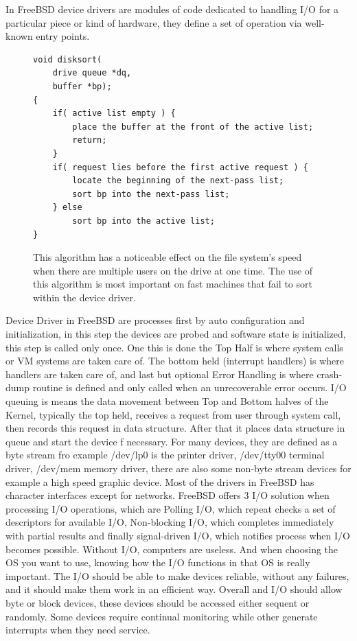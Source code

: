 \documentclass[letterpaper,10pt,draftclsnofoot,onecolumn]{IEEEtran}
\begin{document}
In FreeBSD device drivers are modules of code dedicated to handling I/O for a particular piece or kind of hardware, they define a set of operation via well-known entry points.
\begin{figure}[H]
\caption{This algorithm has a noticeable effect on the file system's speed when there are multiple users on the drive at one time. The use of this algorithm is most important on fast machines that fail to sort within the device driver.}
\begin{lstlisting}
void disksort(
	drive queue *dq,
	buffer *bp);
{
	if( active list empty ) {
		place the buffer at the front of the active list;
		return;
	}
	if( request lies before the first active request ) {
		locate the beginning of the next-pass list;
		sort bp into the next-pass list;
	} else
		sort bp into the active list;
}
\end{lstlisting}
\end{figure}
Device Driver in FreeBSD are processes first by auto configuration and initialization, in this step the devices are probed and software state is initialized, this step is called only once. One this is done the Top Half is where system calls or VM systems are taken care of. The bottom held (interrupt handlers) is where handlers are taken care of, and last but optional Error Handling is where crash-dump routine is defined and only called when an unrecoverable error occurs. I/O queuing is means the data movement between Top and Bottom halves of the Kernel, typically the top held, receives a request from user through system call, then records this request in data structure. After that it places data structure in queue and start the device f necessary. For many devices, they are defined as a byte stream fro example /dev/lp0 is the printer driver, /dev/tty00 terminal driver, /dev/mem memory driver, there are also some non-byte stream devices for example a high speed graphic device. Most of the drivers in FreeBSD has character interfaces except for networks.
FreeBSD offers 3 I/O solution when processing I/O operations, which are Polling I/O, which repeat checks a set of descriptors for available I/O, Non-blocking I/O, which completes immediately with partial results and finally signal-driven I/O, which notifies process when I/O becomes possible.\cite{[2]}
Without I/O, computers are useless. And when choosing the OS you want to use, knowing how the I/O functions in that OS is really important. The I/O should be able to make devices reliable, without any failures, and it should make them work in an efficient way. Overall and I/O should allow byte or block devices, these devices should be accessed either sequent or randomly. Some devices require continual monitoring while other generate interrupts when they need service.
\end{document}
